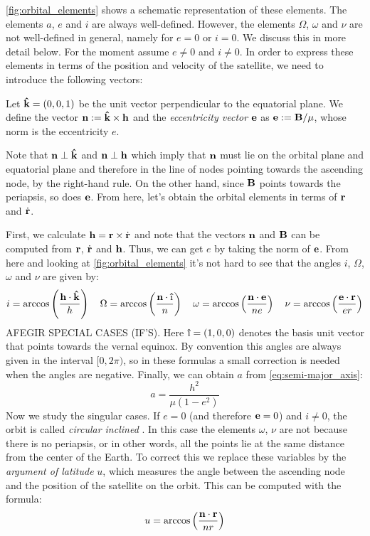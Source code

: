 \documentclass[../main.tex]{subfiles}
\begin{document}
\cref{fig:orbital_elements} shows a schematic representation of these elements. The elements $a$, $e$ and $i$ are always well-defined. However, the elements $\Omega$, $\omega$ and $\nu$ are not well-defined in general, namely for $e=0$ or $i=0$. We discuss this in more detail below. For the moment assume $e\neq 0$ and $i\neq 0$. In order to express these elements in terms of the position and velocity of the satellite, we need to introduce the following vectors:\newpage
\begin{definition}
  Let $\boldsymbol{\mathrm{\hat{k}}}=(0,0,1)$ be the unit vector perpendicular to the equatorial plane. We define the vector $\boldsymbol{\mathrm{n}}:=\boldsymbol{\mathrm{\hat{k}}}\times \boldsymbol{\mathrm{h}}$ and the \emph{eccentricity vector} $\boldsymbol{\mathrm{e}}$ as $\boldsymbol{\mathrm{e}}:=\boldsymbol{\mathrm{B}}/\mu$, whose norm is the eccentricity $e$.
\end{definition}
Note that $\boldsymbol{\mathrm{n}}\perp \boldsymbol{\mathrm{\hat{k}}}$ and $\boldsymbol{\mathrm{n}}\perp \boldsymbol{\mathrm{h}}$ which imply that $\boldsymbol{\mathrm{n}}$ must lie on the orbital plane and equatorial plane and therefore in the line of nodes pointing towards the ascending node, by the right-hand rule. On the other hand, since $\boldsymbol{\mathrm{B}}$ points towards the periapsis, so does $\boldsymbol{\mathrm{e}}$. From here, let's obtain the orbital elements in terms of $\boldsymbol{\mathrm{r}}$ and $\dot{\boldsymbol{\mathrm{r}}}$.

First, we calculate $\boldsymbol{\mathrm{h}}=\boldsymbol{\mathrm{r}}\times\dot{\boldsymbol{\mathrm{r}}}$ and note that the vectors $\boldsymbol{\mathrm{n}}$ and $\boldsymbol{\mathrm{B}}$ can be computed from $\boldsymbol{\mathrm{r}}$, $\dot{\boldsymbol{\mathrm{r}}}$ and $\boldsymbol{\mathrm{h}}$. Thus, we can get $e$ by taking the norm of $\boldsymbol{\mathrm{e}}$. From here and looking at \cref{fig:orbital_elements} it's not hard to see that the angles $i$, $\Omega$, $\omega$ and $\nu$ are given by:
\begin{equation}
  i=\arccos\left(\frac{\vf{h}\cdot \vf{\hat{k}}}{h}\right)\quad \Omega=\arccos\left(\frac{\vf{n}\cdot \vf{\hat{\text\i}}}{n}\right)\quad \omega=\arccos\left(\frac{\vf{n}\cdot \vf{e}}{ne}\right)\quad \nu=\arccos\left(\frac{\vf{e}\cdot \vf{r}}{er}\right)
\end{equation}
AFEGIR SPECIAL CASES (IF'S).
Here $\vf{\hat{\text\i}}=(1,0,0)$ denotes the basis unit vector that points towards the vernal equinox. By convention this angles are always given in the interval $[0,2\pi)$, so in these formulas a small correction is needed when the angles are negative. Finally, we can obtain $a$ from \cref{eq:semi-major_axis}:
\begin{equation}
  a = \frac{h^2}{\mu(1-e^2)}
\end{equation}
Now we study the singular cases. If $e=0$ (and therefore $\boldsymbol{\mathrm{e}}=0$) and $i\ne 0$, the orbit is called \emph{circular inclined} \cite{vallado}. In this case the elements $\omega$, $\nu$ are not because there is no periapsis, or in other words, all the points lie at the same distance from the center of the Earth. To correct this we replace these variables by the \emph{argument of latitude} $u$, which measures the angle between the ascending node and the position of the satellite on the orbit. This can be computed with the formula:
\begin{equation}
  u=\arccos\left(\frac{\boldsymbol{\mathrm{n}}\cdot \boldsymbol{\mathrm{r}}}{nr}\right)
\end{equation}
\end{document}
